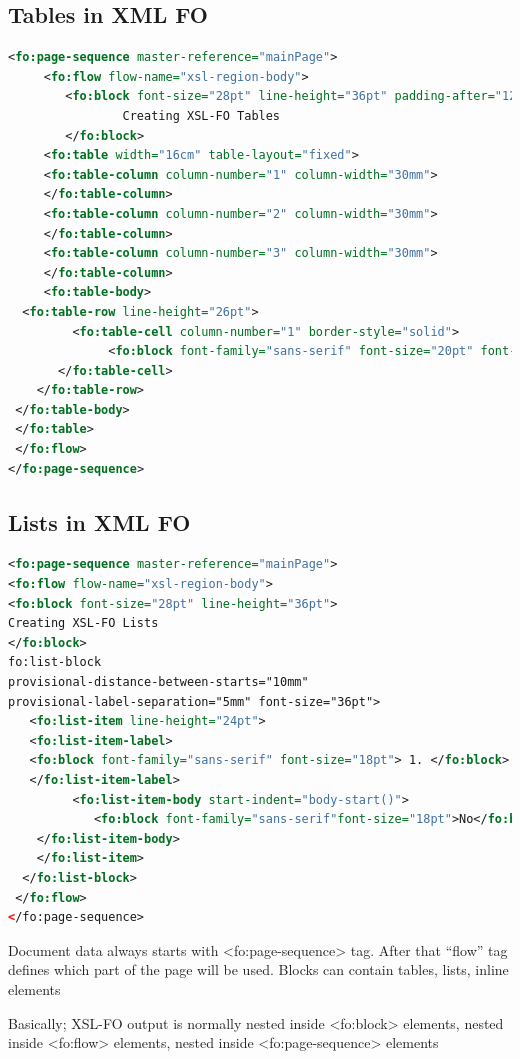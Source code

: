 \subsection{Tables in XML FO}
\begin{lstlisting}[language=xml]
<fo:page-sequence master-reference="mainPage">
     <fo:flow flow-name="xsl-region-body">
        <fo:block font-size="28pt" line-height="36pt" padding-after="12pt">
                Creating XSL-FO Tables
        </fo:block>
     <fo:table width="16cm" table-layout="fixed">
     <fo:table-column column-number="1" column-width="30mm">
     </fo:table-column>
     <fo:table-column column-number="2" column-width="30mm">
     </fo:table-column>
     <fo:table-column column-number="3" column-width="30mm">
     </fo:table-column>
     <fo:table-body>
  <fo:table-row line-height="26pt">
         <fo:table-cell column-number="1" border-style="solid">
              <fo:block font-family="sans-serif" font-size="20pt" font-weight="bold"> State</fo:block>
       </fo:table-cell>
    </fo:table-row>
 </fo:table-body>
 </fo:table>
 </fo:flow>
</fo:page-sequence>
\end{lstlisting}
\cite{informit} 
\subsection{Lists in XML FO}
\begin{lstlisting}[language=xml]
<fo:page-sequence master-reference="mainPage">
<fo:flow flow-name="xsl-region-body">
<fo:block font-size="28pt" line-height="36pt">
Creating XSL-FO Lists
</fo:block>
fo:list-block
provisional-distance-between-starts="10mm"
provisional-label-separation="5mm" font-size="36pt">
   <fo:list-item line-height="24pt">
   <fo:list-item-label>
   <fo:block font-family="sans-serif" font-size="18pt"> 1. </fo:block>
   </fo:list-item-label>
         <fo:list-item-body start-indent="body-start()">
            <fo:block font-family="sans-serif"font-size="18pt">No</fo:block>
    </fo:list-item-body>
    </fo:list-item>
  </fo:list-block>
 </fo:flow>
</fo:page-sequence>
\end{lstlisting}

Document data always starts with <fo:page-sequence> tag. After that “flow” tag defines which part of the page will be used. Blocks can contain tables, lists, inline elements

Basically; XSL-FO output is normally nested inside <fo:block> elements, nested inside <fo:flow> elements, nested inside <fo:page-sequence> elements 